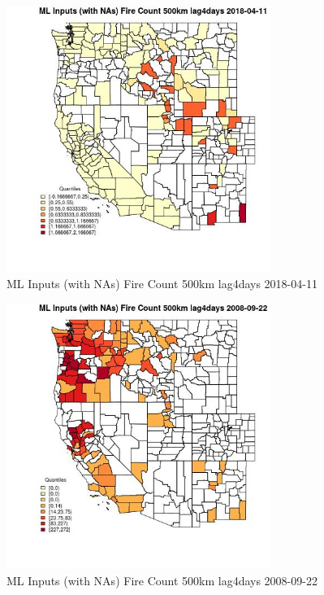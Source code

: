 \begin{figure} 
\centering  
\includegraphics[width=0.77\textwidth]{Code_Outputs/Report_ML_input_PM25_Step4_part_e_de_duplicated_aves_compiled_2019-05-18wNAs_CountyFire_Count_500km_lag4daysMean2018-04-11_2018-04-11.jpg} 
\caption{\label{fig:Report_ML_input_PM25_Step4_part_e_de_duplicated_aves_compiled_2019-05-18wNAsCountyFire_Count_500km_lag4daysMean2018-04-11_2018-04-11}ML Inputs (with NAs) Fire Count 500km lag4days 2018-04-11} 
\end{figure} 
 

\begin{figure} 
\centering  
\includegraphics[width=0.77\textwidth]{Code_Outputs/Report_ML_input_PM25_Step4_part_e_de_duplicated_aves_compiled_2019-05-18wNAs_CountyFire_Count_500km_lag4daysMean2008-09-22_2008-09-22.jpg} 
\caption{\label{fig:Report_ML_input_PM25_Step4_part_e_de_duplicated_aves_compiled_2019-05-18wNAsCountyFire_Count_500km_lag4daysMean2008-09-22_2008-09-22}ML Inputs (with NAs) Fire Count 500km lag4days 2008-09-22} 
\end{figure} 
 

